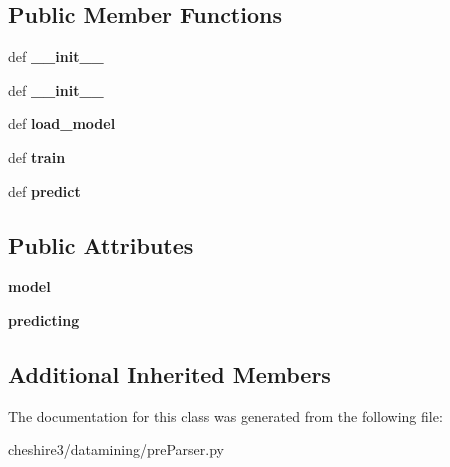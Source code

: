 \subsection*{Public Member Functions}
\begin{DoxyCompactItemize}
\item 
\hypertarget{classcheshire3_1_1datamining_1_1pre_parser_1_1_reverend_pre_parser_a2a7944865145a727dd14170c491e75e9}{def {\bfseries \-\_\-\-\_\-init\-\_\-\-\_\-}}\label{classcheshire3_1_1datamining_1_1pre_parser_1_1_reverend_pre_parser_a2a7944865145a727dd14170c491e75e9}

\item 
\hypertarget{classcheshire3_1_1datamining_1_1pre_parser_1_1_reverend_pre_parser_a2a7944865145a727dd14170c491e75e9}{def {\bfseries \-\_\-\-\_\-init\-\_\-\-\_\-}}\label{classcheshire3_1_1datamining_1_1pre_parser_1_1_reverend_pre_parser_a2a7944865145a727dd14170c491e75e9}

\item 
\hypertarget{classcheshire3_1_1datamining_1_1pre_parser_1_1_reverend_pre_parser_ae1a7c99e29a86e49db25c98f1903e3b2}{def {\bfseries load\-\_\-model}}\label{classcheshire3_1_1datamining_1_1pre_parser_1_1_reverend_pre_parser_ae1a7c99e29a86e49db25c98f1903e3b2}

\item 
\hypertarget{classcheshire3_1_1datamining_1_1pre_parser_1_1_reverend_pre_parser_a5291582f55acc96370b803494def5e6a}{def {\bfseries train}}\label{classcheshire3_1_1datamining_1_1pre_parser_1_1_reverend_pre_parser_a5291582f55acc96370b803494def5e6a}

\item 
\hypertarget{classcheshire3_1_1datamining_1_1pre_parser_1_1_reverend_pre_parser_a2f12fe072fef8c9ba010577b5cea46e2}{def {\bfseries predict}}\label{classcheshire3_1_1datamining_1_1pre_parser_1_1_reverend_pre_parser_a2f12fe072fef8c9ba010577b5cea46e2}

\end{DoxyCompactItemize}
\subsection*{Public Attributes}
\begin{DoxyCompactItemize}
\item 
\hypertarget{classcheshire3_1_1datamining_1_1pre_parser_1_1_reverend_pre_parser_a297335b41c6fb85903cb9c56b5fdf66d}{{\bfseries model}}\label{classcheshire3_1_1datamining_1_1pre_parser_1_1_reverend_pre_parser_a297335b41c6fb85903cb9c56b5fdf66d}

\item 
\hypertarget{classcheshire3_1_1datamining_1_1pre_parser_1_1_reverend_pre_parser_a27b933e1a7a67ab70e0c120579a70b15}{{\bfseries predicting}}\label{classcheshire3_1_1datamining_1_1pre_parser_1_1_reverend_pre_parser_a27b933e1a7a67ab70e0c120579a70b15}

\end{DoxyCompactItemize}
\subsection*{Additional Inherited Members}


The documentation for this class was generated from the following file\-:\begin{DoxyCompactItemize}
\item 
cheshire3/datamining/pre\-Parser.\-py\end{DoxyCompactItemize}
